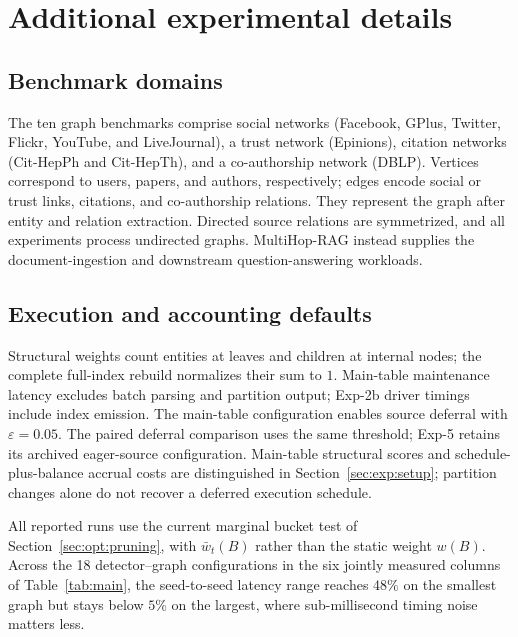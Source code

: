 \clearpage
\nobalance
\appendix

\section{Additional experimental details}

\subsection{Benchmark domains}
\label{app:dataset-details}

The ten graph benchmarks comprise social networks (Facebook, GPlus, Twitter,
Flickr, YouTube, and LiveJournal), a trust network (Epinions), citation networks (Cit-HepPh
and Cit-HepTh), and a co-authorship network (DBLP). Vertices correspond to
users, papers, and authors, respectively; edges encode social or trust links,
citations, and co-authorship relations. They represent the graph after entity
and relation extraction. Directed source relations are symmetrized, and all
experiments process undirected graphs. MultiHop-RAG instead supplies the
document-ingestion and downstream question-answering workloads.

\subsection{Execution and accounting defaults}
\label{app:exp-defaults}

Structural weights count entities at leaves and children at internal nodes;
the complete full-index rebuild normalizes their sum to $1$. Main-table
maintenance latency excludes batch parsing and partition output; Exp-2b
driver timings include index emission. The main-table configuration enables
source deferral with $\varepsilon=0.05$. The paired deferral comparison
uses the same threshold; Exp-5 retains its archived eager-source configuration.
Main-table structural scores and schedule-plus-balance accrual costs are
distinguished in Section~\ref{sec:exp:setup}; partition changes alone do not
recover a deferred execution schedule.

All reported \DyLo{} runs use the current marginal bucket test of
Section~\ref{sec:opt:pruning}, with $\bar w_t(B)$ rather than the static weight
$w(B)$. Across the 18 \DyLo{} detector--graph configurations in the six jointly
measured columns of Table~\ref{tab:main}, the seed-to-seed latency range reaches
$48\%$ on the smallest graph but stays below $5\%$ on the largest, where
sub-millisecond timing noise matters less.

